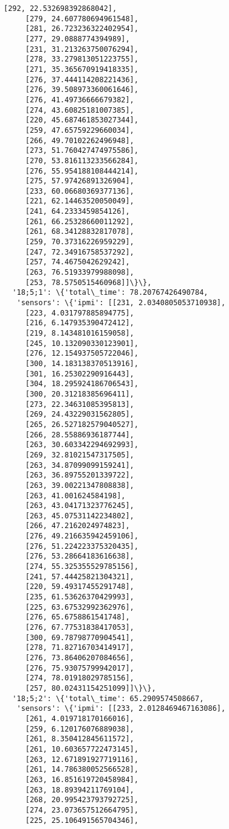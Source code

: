 \documentclass[11pt]{article}
\begin{document}
\begin{tcolorbox}[breakable, size=fbox, boxrule=.5pt, pad at break*=1mm, opacityfill=0]
\begin{Verbatim}[commandchars=\\\{\}]
     [292, 22.532698392868042],
     [279, 24.607780694961548],
     [281, 26.723236322402954],
     [277, 29.0888774394989],
     [231, 31.213263750076294],
     [278, 33.279813051223755],
     [271, 35.365670919418335],
     [276, 37.444114208221436],
     [276, 39.508973360061646],
     [276, 41.49736666679382],
     [274, 43.60825181007385],
     [220, 45.687461853027344],
     [259, 47.65759229660034],
     [266, 49.70102262496948],
     [273, 51.760427474975586],
     [270, 53.816113233566284],
     [276, 55.954188108444214],
     [275, 57.97426891326904],
     [233, 60.06680369377136],
     [221, 62.14463520050049],
     [241, 64.2333459854126],
     [261, 66.25328660011292],
     [261, 68.34128832817078],
     [259, 70.37316226959229],
     [247, 72.34916758537292],
     [257, 74.4675042629242],
     [263, 76.51933979988098],
     [253, 78.5750515460968]]\}\},
  '18;5;1': \{'total\_time': 78.20767426490784,
   'sensors': \{'ipmi': [[231, 2.0340805053710938],
     [223, 4.031797885894775],
     [216, 6.147935390472412],
     [219, 8.143481016159058],
     [245, 10.132090330123901],
     [276, 12.154937505722046],
     [300, 14.183138370513916],
     [301, 16.25302290916443],
     [304, 18.295924186706543],
     [300, 20.31218385696411],
     [273, 22.34631085395813],
     [269, 24.43229031562805],
     [265, 26.527182579040527],
     [266, 28.55886936187744],
     [263, 30.603342294692993],
     [269, 32.81021547317505],
     [263, 34.87099099159241],
     [263, 36.89755201339722],
     [263, 39.00221347808838],
     [263, 41.001624584198],
     [263, 43.04171323776245],
     [263, 45.07531142234802],
     [266, 47.2162024974823],
     [276, 49.216635942459106],
     [276, 51.224223375320435],
     [276, 53.28664183616638],
     [274, 55.325355529785156],
     [241, 57.44425821304321],
     [220, 59.49317455291748],
     [235, 61.53626370429993],
     [225, 63.67532992362976],
     [276, 65.6758861541748],
     [276, 67.77531838417053],
     [300, 69.78798770904541],
     [278, 71.82716703414917],
     [276, 73.86406207084656],
     [276, 75.93075799942017],
     [274, 78.01918029785156],
     [257, 80.02431154251099]]\}\},
  '18;5;2': \{'total\_time': 65.2909574508667,
   'sensors': \{'ipmi': [[233, 2.0128469467163086],
     [261, 4.019718170166016],
     [259, 6.120176076889038],
     [261, 8.350412845611572],
     [261, 10.603657722473145],
     [263, 12.671891927719116],
     [261, 14.786380052566528],
     [263, 16.851619720458984],
     [263, 18.89394211769104],
     [268, 20.995423793792725],
     [274, 23.073657512664795],
     [225, 25.106491565704346],

\end{Verbatim}
\end{tcolorbox}
\end{document}
